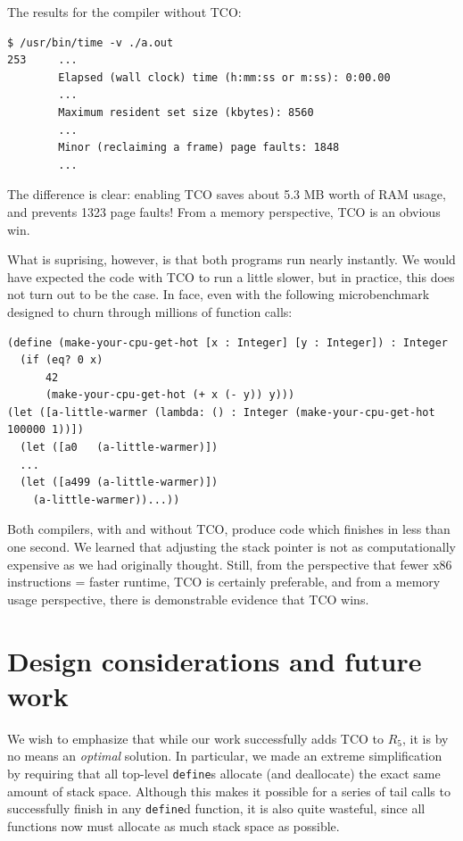 \documentclass[12pt]{article}
\begin{document}
The results for the compiler without TCO:

\begin{verbatim}
$ /usr/bin/time -v ./a.out 
253     ...
        Elapsed (wall clock) time (h:mm:ss or m:ss): 0:00.00
        ...
        Maximum resident set size (kbytes): 8560
        ...
        Minor (reclaiming a frame) page faults: 1848
        ...
\end{verbatim}

The difference is clear: enabling TCO saves about 5.3 MB worth of RAM usage, and
prevents 1323 page faults! From a memory perspective, TCO is an obvious win.

What is suprising, however, is that both programs run nearly instantly. We would
have expected the code with TCO to run a little slower, but in practice, this
does not turn out to be the case. In face, even with the following microbenchmark
designed to churn through millions of function calls:

\begin{verbatim}
(define (make-your-cpu-get-hot [x : Integer] [y : Integer]) : Integer
  (if (eq? 0 x)
      42
      (make-your-cpu-get-hot (+ x (- y)) y)))
(let ([a-little-warmer (lambda: () : Integer (make-your-cpu-get-hot 100000 1))])
  (let ([a0   (a-little-warmer)])
  ...
  (let ([a499 (a-little-warmer)])
    (a-little-warmer))...))
\end{verbatim}

Both compilers, with and without TCO, produce code which finishes in less than one
second. We learned that adjusting the stack pointer is not as computationally
expensive as we had originally thought. Still, from the perspective that fewer
x86 instructions = faster runtime, TCO is certainly preferable, and from a
memory usage perspective, there is demonstrable evidence that TCO wins.

\section{Design considerations and future work}

We wish to emphasize that while our work successfully adds TCO to $R_5$, it is by
no means an \textit{optimal} solution. In particular, we made an extreme simplification
by requiring that all top-level \verb+define+s allocate (and deallocate) the exact
same amount of stack space. Although this makes it possible for a series of tail calls
to successfully finish in any \verb+define+d function, it is also quite wasteful, since
all functions now must allocate as much stack space as possible.
\end{document}
